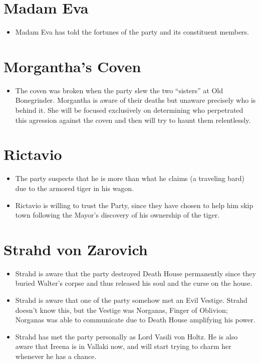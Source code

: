 \documentclass[a4paper,11pt]{article}
\begin{document}
\section{Madam Eva}
\begin{itemize}
  \item Madam Eva has told the fortunes of the party and its constituent members.
\end{itemize}

\section{Morgantha's Coven}
\begin{itemize}
  \item The coven was broken when the party slew the two ``sisters'' at Old Bonegrinder. Morgantha is aware of 
  their deaths but unaware precisely who is behind it. She will be focused exclusively on determining who 
  perpetrated this agression against the coven and then will try to haunt them relentlessly.
\end{itemize}

\section{Rictavio}
\begin{itemize}
  \item The party suspects that he is more than what he claims (a traveling bard) due to the armored tiger in his 
  wagon.
  \item Rictavio is willing to trust the Party, since they have chosen to help him skip town following the Mayor's
  discovery of his ownership of the tiger.
\end{itemize}

\section{Strahd von Zarovich}
\begin{itemize}
  \item Strahd is aware that the party destroyed Death House permanently since they buried Walter's corpse and 
  thus released his soul and the curse on the house.
  \item Strahd is aware that one of the party somehow met an Evil Vestige. Strahd doesn't know this, but the 
  Vestige was Norganas, Finger of Oblivion; Norganas was able to communicate due to Death House amplifying his 
  power.
  \item Strahd has met the party personally as Lord Vasili von Holtz. He is also aware that Ireena is in Vallaki 
  now, and will start trying to charm her whenever he has a chance.
\end{itemize}
\end{document}
